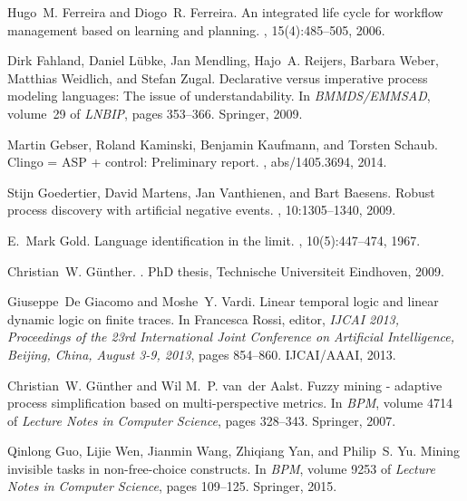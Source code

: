 \documentclass[a4wide,11pt]{article}
\theoremstyle{definition}
\theoremstyle{plain}
\begin{document}
\begin{thebibliography}{MWvdAvdB06}
Hugo~M. Ferreira and Diogo~R. Ferreira.
\newblock An integrated life cycle for workflow management based on learning
  and planning.
, 15(4):485--505, 2006.

Dirk Fahland, Daniel L{\"{u}}bke, Jan Mendling, Hajo~A. Reijers, Barbara Weber,
  Matthias Weidlich, and Stefan Zugal.
\newblock Declarative versus imperative process modeling languages: The issue
  of understandability.
\newblock In {\em {BMMDS/EMMSAD}}, volume~29 of {\em LNBIP}, pages 353--366.
  Springer, 2009.

Martin Gebser, Roland Kaminski, Benjamin Kaufmann, and Torsten Schaub.
\newblock Clingo = {ASP} + control: Preliminary report.
, abs/1405.3694, 2014.

Stijn Goedertier, David Martens, Jan Vanthienen, and Bart Baesens.
\newblock Robust process discovery with artificial negative events.
, 10:1305--1340, 2009.

E.~Mark Gold.
\newblock Language identification in the limit.
, 10(5):447--474, 1967.

Christian~W. G{\"{u}}nther.
.
\newblock PhD thesis, Technische Universiteit Eindhoven, 2009.

Giuseppe~De Giacomo and Moshe~Y. Vardi.
\newblock Linear temporal logic and linear dynamic logic on finite traces.
\newblock In Francesca Rossi, editor, {\em {IJCAI} 2013, Proceedings of the
  23rd International Joint Conference on Artificial Intelligence, Beijing,
  China, August 3-9, 2013}, pages 854--860. {IJCAI/AAAI}, 2013.

Christian~W. G{\"{u}}nther and Wil M.~P. van~der Aalst.
\newblock Fuzzy mining - adaptive process simplification based on
  multi-perspective metrics.
\newblock In {\em {BPM}}, volume 4714 of {\em Lecture Notes in Computer
  Science}, pages 328--343. Springer, 2007.

Qinlong Guo, Lijie Wen, Jianmin Wang, Zhiqiang Yan, and Philip~S. Yu.
\newblock Mining invisible tasks in non-free-choice constructs.
\newblock In {\em {BPM}}, volume 9253 of {\em Lecture Notes in Computer
  Science}, pages 109--125. Springer, 2015.


\end{thebibliography}
\end{document}
